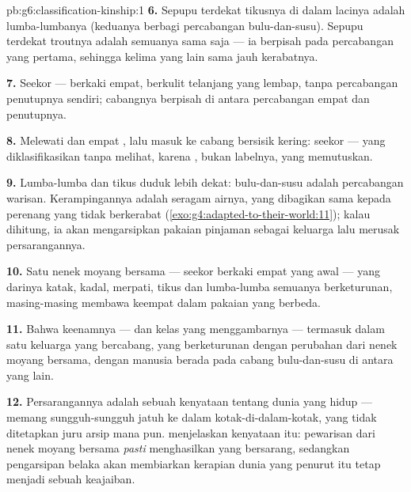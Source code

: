 \begin{solution}{pb:g6:classification-kinship:1}
\textbf{6.} Sepupu terdekat tikusnya di dalam lacinya adalah
lumba-lumbanya (keduanya berbagi percabangan bulu-dan-susu). Sepupu
terdekat  troutnya adalah semuanya sama saja --- ia berpisah pada
percabangan yang pertama, sehingga kelima yang lain sama jauh
kerabatnya.

\textbf{7.} Seekor  --- berkaki empat, berkulit telanjang yang
lembap, tanpa percabangan penutupnya sendiri; cabangnya berpisah di
antara percabangan empat  dan penutupnya.

\textbf{8.} Melewati  dan empat , lalu
masuk ke cabang bersisik kering: seekor  --- yang
diklasifikasikan tanpa melihat, karena , bukan labelnya,
yang memutuskan.

\textbf{9.} Lumba-lumba dan tikus duduk lebih dekat: bulu-dan-susu
adalah percabangan warisan. Kerampingannya adalah seragam airnya, yang
dibagikan sama kepada perenang yang tidak berkerabat
(\cref{exo:g4:adapted-to-their-world:11}); kalau dihitung, ia akan
mengarsipkan pakaian pinjaman sebagai keluarga lalu merusak
persarangannya.

\textbf{10.} Satu  nenek moyang bersama --- seekor 
berkaki empat yang awal --- yang darinya katak, kadal, merpati, tikus
dan lumba-lumba semuanya berketurunan, masing-masing membawa keempat
 dalam pakaian yang berbeda.

\textbf{11.} Bahwa keenamnya --- dan kelas yang menggambarnya ---
termasuk dalam satu keluarga yang bercabang, yang berketurunan dengan
perubahan dari nenek moyang bersama, dengan manusia berada pada cabang
bulu-dan-susu di antara yang lain.

\textbf{12.} Persarangannya adalah sebuah kenyataan tentang dunia yang
hidup ---  memang sungguh-sungguh jatuh ke dalam
kotak-di-dalam-kotak, yang tidak ditetapkan juru arsip mana pun.
 menjelaskan kenyataan itu: pewarisan dari nenek moyang
bersama \emph{pasti} menghasilkan  yang bersarang, sedangkan
pengarsipan belaka akan membiarkan kerapian dunia yang penurut itu
tetap menjadi sebuah keajaiban.
\end{solution}
